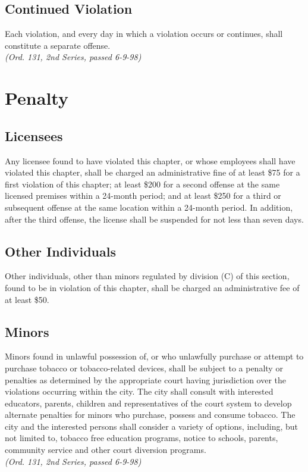 \subsection{Continued Violation}
Each violation, and every day in which a violation occurs or continues, shall constitute a separate offense.\\
\emph{(Ord. 131, 2nd Series, passed 6-9-98)}

\setcounter{section}{98}
\section{Penalty}
\subsection{Licensees}
Any licensee found to have violated this chapter, or whose employees shall have violated this chapter, shall be charged an administrative fine of at least \$75 for a first violation of this chapter; at least \$200 for a second offense at the same licensed premises within a 24-month period; and at least \$250 for a third or subsequent offense at the same location within a 24-month period.  In addition, after the third offense, the license shall be suspended for not less than seven days.
\subsection{Other Individuals}
Other individuals, other than minors regulated by division (C) of this section, found to be in violation of this chapter, shall be charged an administrative fee of at least \$50.
\subsection{Minors}
Minors found in unlawful possession of, or who unlawfully purchase or attempt to purchase tobacco or tobacco-related devices, shall be subject to a penalty or penalties as determined by the appropriate court having jurisdiction over the violations occurring within the city.  The city shall consult with interested educators, parents, children and representatives of the court system to develop alternate penalties for minors who purchase, possess and consume tobacco.  The city and the interested persons shall consider a variety of options, including, but not limited to, tobacco free education programs, notice to schools, parents, community service and other court diversion programs.\\
\emph{(Ord. 131, 2nd Series, passed 6-9-98)}
